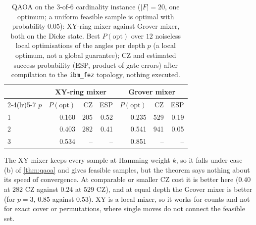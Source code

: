 \begin{table}[t]
\centering\small
\caption{ QAOA on the $3$-of-$6$ cardinality instance ($|F|=20$, one optimum; a uniform feasible sample is optimal with probability $0.05$): XY-ring mixer against Grover mixer, both on the Dicke state. Best $P(\mathrm{opt})$ over $12$ noiseless local optimisations of the angles per depth $p$ (a local optimum, not a global guarantee); CZ and estimated success probability (ESP, product of gate errors) after compilation to the \texttt{ibm\_fez} topology, nothing executed.}\label{tab:gen_xy}
\begin{tabular}{lrrrrrr}
\toprule
 & \multicolumn{3}{c}{XY-ring mixer} & \multicolumn{3}{c}{Grover mixer}\\
\cmidrule(lr){2-4}\cmidrule(lr){5-7}
$p$ & $P(\mathrm{opt})$ & CZ & ESP & $P(\mathrm{opt})$ & CZ & ESP\\
\midrule
1 & 0.160 & 205 & 0.52 & 0.235 & 529 & 0.19\\
2 & 0.403 & 282 & 0.41 & 0.541 & 941 & 0.05\\
3 & 0.534 & -- & -- & 0.851 & -- & --\\
\bottomrule
\end{tabular}
\end{table}
The XY mixer keeps every sample at Hamming weight $k$, so it falls under case (b) of \cref{thm:qaoa} and gives feasible samples, but the theorem says nothing about its speed of convergence. At comparable or smaller CZ cost it is better here ($0.40$ at $282$ CZ against $0.24$ at $529$ CZ), and at equal depth the Grover mixer is better (for $p=3$, $0.85$ against $0.53$). XY is a local mixer, so it works for counts and not for exact cover or permutations, where single moves do not connect the feasible set.

